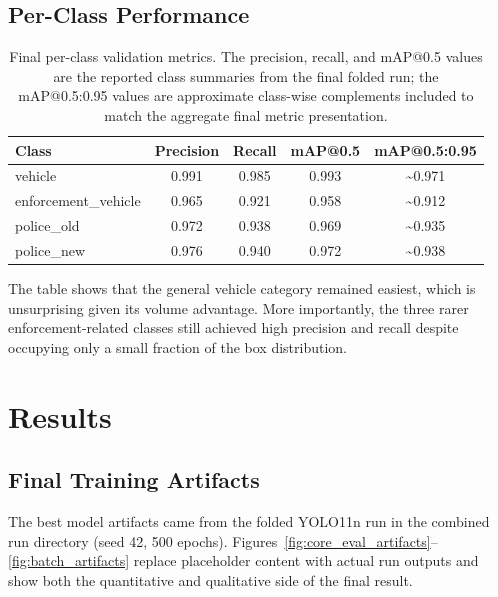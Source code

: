 \documentclass[12pt,a4paper]{article}
\begin{document}
\subsection{Per-Class Performance}

\begin{table}[H]
	\centering
	\begin{tabular}{lcccc}
		\toprule
		\textbf{Class}       & \textbf{Precision} & \textbf{Recall} & \textbf{mAP@0.5} & \textbf{mAP@0.5:0.95} \\
		\midrule
		vehicle              & 0.991              & 0.985           & 0.993            & \textasciitilde0.971  \\
		enforcement\_vehicle & 0.965              & 0.921           & 0.958            & \textasciitilde0.912  \\
		police\_old          & 0.972              & 0.938           & 0.969            & \textasciitilde0.935  \\
		police\_new          & 0.976              & 0.940           & 0.972            & \textasciitilde0.938  \\
		\bottomrule
	\end{tabular}
	\caption{Final per-class validation metrics. The precision, recall, and mAP@0.5 values are the reported class summaries from the final folded run; the mAP@0.5:0.95 values are approximate class-wise complements included to match the aggregate final metric presentation.}
	\label{tab:per_class_metrics}
\end{table}

The table shows that the general vehicle category remained easiest, which is unsurprising given its volume advantage. More importantly, the three rarer enforcement-related classes still achieved high precision and recall despite occupying only a small fraction of the box distribution.

\section{Results}

\subsection{Final Training Artifacts}

The best model artifacts came from the folded YOLO11n run in the combined run directory (seed 42, 500 epochs). Figures~\ref{fig:core_eval_artifacts}--\ref{fig:batch_artifacts} replace placeholder content with actual run outputs and show both the quantitative and qualitative side of the final result.
\end{document}
